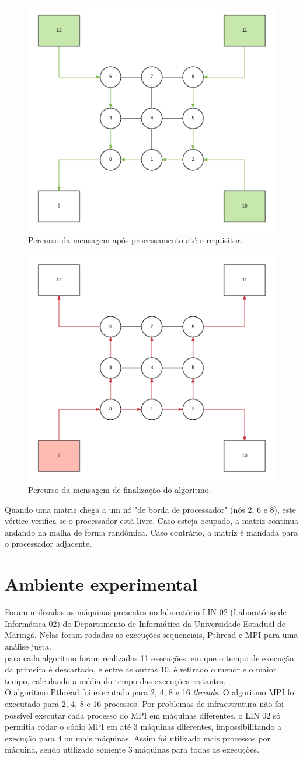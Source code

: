 \documentclass[12pt]{article}
\newcommand\tab[1][1cm]{\hspace*{#1}}
\begin{document}
\begin{figure}[ht]
\centering
\includegraphics[width=.5\textwidth]{return-grid.png}
\caption{Percurso da mensagem após processamento até o requisitor.}
\label{fig:return}
\end{figure}

\begin{figure}[ht]
\centering
\includegraphics[width=.5\textwidth]{kill-grid.png}
\caption{Percurso da mensagem de finalização do algoritmo.}
\label{fig:kill}
\end{figure}

Quando uma matriz chega a um nó "de borda de processador" (nós 2, 6 e 8), este vértice verifica se o processador está livre. Caso esteja ocupado, a matriz continua andando na malha de forma randômica. Caso contrário, a matriz é mandada para o processador adjacente.

\section{Ambiente experimental}\label{sec:amb}
\tab Foram utilizadas as máquinas presentes no laboratório LIN 02 (Laboratório de Informática 02) do Departamento de Informática da Universidade Estadual de Maringá. Nelas foram rodadas as execuções sequenciais, Pthread e MPI para uma análise justa. 
\\
\tab para cada algoritmo foram realizadas 11 execuções, em que o tempo de execução da primeira é descartado, e entre as outras 10, é retirado o menor e o maior tempo, calculando a média do tempo das execuções restantes.
\\ 
\tab O algoritmo Pthread foi executado para 2, 4, 8 e 16 \textit{threads}. O algoritmo MPI foi executado para 2, 4, 8 e 16 processos. Por problemas de infraestrutura não foi possível executar cada processo do MPI em máquinas diferentes. o LIN 02 só permitia rodar o códio MPI em até 3 máquinas diferentes, impossibilitando a execução para 4 ou mais máquinas. Assim foi utilizado mais processos por máquina, sendo utilizado somente 3 máquinas para todas as execuções.
\end{document}
